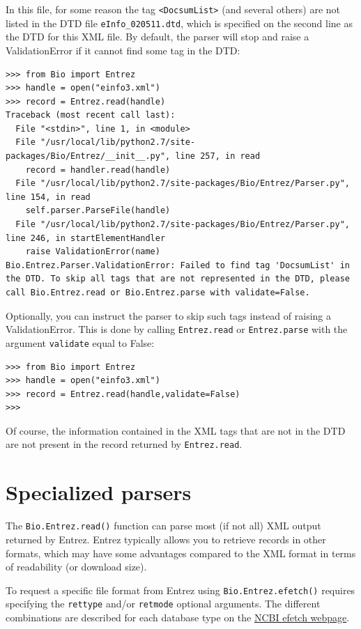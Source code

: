 \documentclass{report}
\begin{document}
In this file, for some reason the tag \verb|<DocsumList>| (and several others) are not listed in the DTD file \verb|eInfo_020511.dtd|, which is specified on the second line as the DTD for this XML file. By default, the parser will stop and raise a ValidationError if it cannot find some tag in the DTD:

\begin{verbatim}
>>> from Bio import Entrez
>>> handle = open("einfo3.xml")
>>> record = Entrez.read(handle)
Traceback (most recent call last):
  File "<stdin>", line 1, in <module>
  File "/usr/local/lib/python2.7/site-packages/Bio/Entrez/__init__.py", line 257, in read
    record = handler.read(handle)
  File "/usr/local/lib/python2.7/site-packages/Bio/Entrez/Parser.py", line 154, in read
    self.parser.ParseFile(handle)
  File "/usr/local/lib/python2.7/site-packages/Bio/Entrez/Parser.py", line 246, in startElementHandler
    raise ValidationError(name)
Bio.Entrez.Parser.ValidationError: Failed to find tag 'DocsumList' in the DTD. To skip all tags that are not represented in the DTD, please call Bio.Entrez.read or Bio.Entrez.parse with validate=False.
\end{verbatim}
Optionally, you can instruct the parser to skip such tags instead of raising a ValidationError. This is done by calling \verb|Entrez.read| or \verb|Entrez.parse| with the argument \verb|validate| equal to False:
\begin{verbatim}
>>> from Bio import Entrez
>>> handle = open("einfo3.xml")
>>> record = Entrez.read(handle,validate=False)
>>>
\end{verbatim}
Of course, the information contained in the XML tags that are not in the DTD are not present in the record returned by \verb|Entrez.read|.


\section{Specialized parsers}
\label{sec:entrez-specialized-parsers}

The \verb|Bio.Entrez.read()| function can parse most (if not all) XML output returned by Entrez. Entrez typically allows you to retrieve records in other formats, which may have some advantages compared to the XML format in terms of readability (or download size).

To request a specific file format from Entrez using \verb|Bio.Entrez.efetch()| requires specifying the \verb|rettype| and/or \verb|retmode| optional arguments.  The different combinations are described for each database type on the \href{http://www.ncbi.nlm.nih.gov/entrez/query/static/efetch_help.html}{NCBI efetch webpage}.
\end{document}
